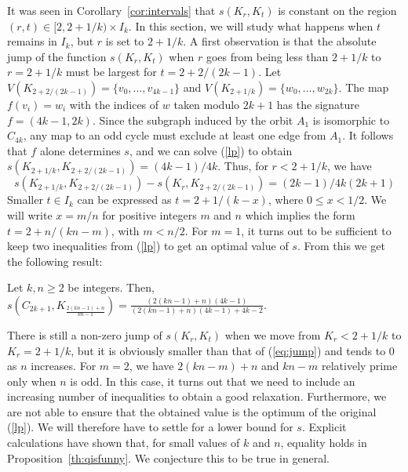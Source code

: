 \documentclass[11pt,a4paper]{article}
\begin{document}
It was seen in Corollary~\ref{cor:intervals} that $s(K_r, K_{t})$ is constant
on the region $(r,t) \in [2,2+1/k) \times I_k$.
In this section, we will study what happens when $t$ remains in $I_k$, but
$r$ is set to $2+1/k$.
A first observation is that the absolute jump of the function
$s(K_r, K_{t})$ when $r$ goes from being less than $2+1/k$
to $r = 2+1/k$  must be largest for $t = 2+2/(2k-1)$.
Let $V(K_{2+2/(2k-1)}) = \{v_0, \ldots, v_{4k-1}\}$ and
$V(K_{2+1/k}) = \{w_0, \ldots, w_{2k}\}$.
The map $f(v_i) = w_i$ with the indices of $w$ taken modulo $2k+1$ has the
signature $f = (4k-1,2k)$.
Since the subgraph induced by the orbit $A_1$ is isomorphic to $C_{4k}$,
any map to an odd cycle must exclude at least one edge from $A_1$.
It follows that $f$ alone determines $s$, 
and we can solve (\ref{lp}) to obtain $s(K_{2+1/k}, K_{2+2/(2k-1)}) = (4k-1)/4k$.
Thus, for $r < 2+1/k$, we have
\begin{equation}
\label{eq:jump}
  s(K_{2+1/k}, K_{2+2/(2k-1)}) - s(K_r, K_{2+2/(2k-1)}) = (2k-1)/4k(2k+1)
\end{equation}
Smaller $t \in I_k$ can be expressed as $t = 2 + 1/(k-x)$, 
where $0 \leq x < 1/2$.
We will write $x = m/n$ for positive integers $m$ and $n$ which 
implies the form $t = 2 + n/(kn-m)$, with $m < n/2$.
For $m = 1$, it turns out to be sufficient to keep two inequalities 
from (\ref{lp}) to get an optimal value of $s$. 
From this we get the following result:





\begin{proposition} \label{prop:m1}
Let $k,n \geq 2$ be integers. Then, $s(C_{2k+1},K_{\frac{2(kn-1)+n}{kn-1}})=\frac{(2(kn-1)+n)(4k-1)}{(2(kn-1)+n)(4k-1)+4k-2}$.
\end{proposition}
There is still a non-zero jump of $s(K_r, K_{t})$ when we move from 
$K_r < 2+1/k$ to $K_r = 2+1/k$, but it is obviously smaller than that
of (\ref{eq:jump}) and tends to 0 as $n$ increases.
For $m = 2$, we have $2(kn-m)+n$ and $kn-m$ relatively prime only when $n$
is odd.
In this case, it turns out that we need to include an increasing number of
inequalities to obtain a good relaxation.
Furthermore, we are not able to ensure that the obtained value is the
optimum of the original (\ref{lp}).
We will therefore have to settle for a lower bound for $s$.
Explicit calculations have shown that, for small values of $k$ and $n$,
equality holds in Proposition~\ref{th:qisfunny}.
We conjecture this to be true in general.
\end{document}

